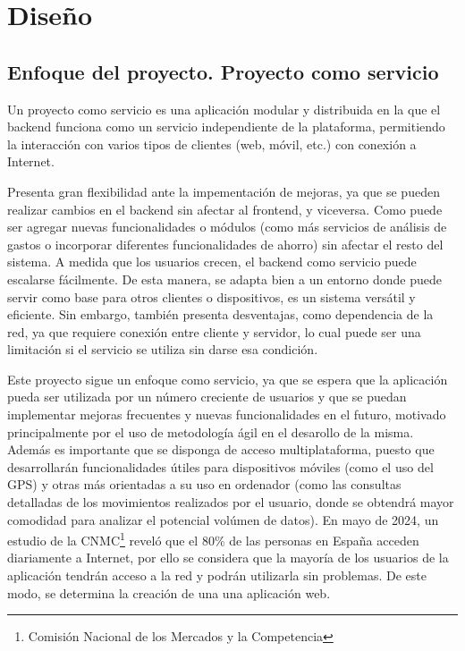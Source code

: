 \chapter{Diseño}

\section{Enfoque del proyecto. Proyecto como servicio}
Un proyecto como servicio es una aplicación modular y distribuida en la que el backend funciona como un servicio independiente de la plataforma, permitiendo la interacción con varios tipos de clientes (web, móvil, etc.) con conexión a Internet. 

Presenta gran flexibilidad ante la impementación de mejoras, ya que se pueden realizar cambios en el backend sin afectar al frontend, y viceversa. Como puede ser agregar nuevas funcionalidades o módulos (como más servicios de análisis de gastos o incorporar diferentes funcionalidades de ahorro) sin afectar el resto del sistema. A medida que los usuarios crecen, el backend como servicio puede escalarse fácilmente. De esta manera, se adapta bien a un entorno donde puede servir como base para otros clientes o dispositivos, es un sistema versátil y eficiente. Sin embargo, también presenta desventajas, como dependencia de la red, ya que requiere conexión entre cliente y servidor, lo cual puede ser una limitación si el servicio se utiliza sin darse esa condición\cite{galster2014variability}.

Este proyecto sigue un enfoque como servicio, ya que se espera que la aplicación pueda ser utilizada por un número creciente de usuarios y que se puedan implementar mejoras frecuentes y nuevas funcionalidades en el futuro, motivado principalmente por el uso de metodología ágil en el desarollo de la misma. Además es importante que se disponga de acceso multiplataforma, puesto que desarrollarán funcionalidades útiles para dispositivos móviles (como el uso del GPS) y otras más orientadas a su uso en ordenador (como las consultas detalladas de los movimientos realizados por el usuario, donde se obtendrá mayor comodidad para analizar el potencial volúmen de datos). En mayo de 2024, un estudio de la CNMC\footnote{Comisión Nacional de los Mercados y la Competencia} reveló que el 80\% de las personas en España acceden diariamente a Internet, por ello se considera que la mayoría de los usuarios de la aplicación tendrán acceso a la red y podrán utilizarla sin problemas\cite{cnmc2024}. 
De este modo, se determina la creación de una una aplicación web.

